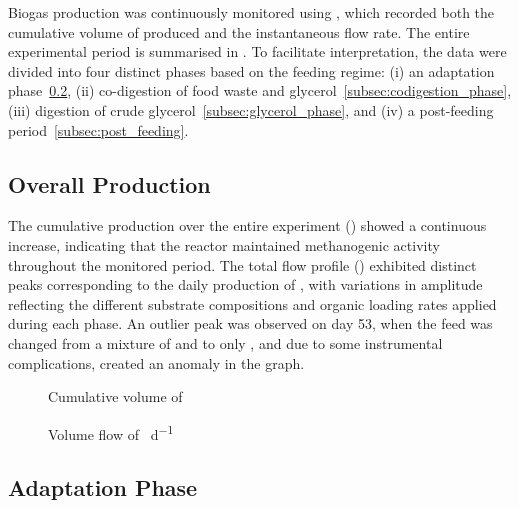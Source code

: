 \documentclass[12pt, a4paper, oneside]{report}
\begin{document}
Biogas production was continuously monitored using , which recorded both the cumulative volume of  produced and the instantaneous flow rate. The entire experimental period is summarised in . To facilitate interpretation, the data were divided into four distinct phases based on the feeding regime: (i) an adaptation phase~\ref{subsec:adaptation_phase}, (ii) co-digestion of food waste and glycerol~\ref{subsec:codigestion_phase}, (iii) digestion of crude glycerol~\ref{subsec:glycerol_phase}, and (iv) a post-feeding period~\ref{subsec:post_feeding}.

\subsection{Overall Production}
\label{subsec:overall_production}

The cumulative  production over the entire experiment () showed a continuous increase, indicating that the reactor maintained methanogenic activity throughout the monitored period. The total flow profile () exhibited distinct peaks corresponding to the daily production of , with variations in amplitude reflecting the different substrate compositions and organic loading rates applied during each phase. An outlier peak was observed on day \num{53}, when the feed was changed from a mixture of  and  to only , and due to some instrumental complications, created an anomaly in the graph.

\begin{figure}[H]
    \centering
    \caption{Cumulative volume of  \unit{\nml}}
    \label{graph:total-accumulation}
\end{figure}

\begin{figure}[H]
    \centering
    \caption{Volume flow of  \unit{\nml\per\day}}
    \label{graph:total-flow}
\end{figure}

\subsection{Adaptation Phase}
\label{subsec:adaptation_phase}
\end{document}
